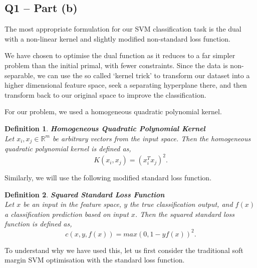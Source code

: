 \documentclass{article}
\newtheorem{definition}{Definition}[section]
\begin{document}
\subsection*{\textbf{Q1 – Part (b)}}
The most appropriate formulation for our SVM classification task is the dual with a non-linear kernel and slightly modified non-standard loss function. \par

We have chosen to optimise the dual function as it reduces to a far simpler problem than the initial primal, with fewer constraints. Since the data is non-separable, we can use the so called `kernel trick' \cite{scholkopf1997kernel, scholkopf1998nonlinear} to transform our dataset into a higher dimensional feature space, seek a separating hyperplane there, and then transform back to our original space to improve the classification. \par 

For our problem, we used a homogeneous quadratic polynomial kernel.
\begin{definition} \textbf{Homogeneous Quadratic Polynomial Kernel} \cite{shashua2009introduction} \\
Let $x_{i}, x_{j} \in \mathbb{R}^{m}$ be arbitrary vectors from the input space. Then the homogeneous quadratic polynomial kernel is defined as,
\begin{equation}
    K(x_{i},x_{j}) = (x_{i}^{T}x_{j})^2.
\end{equation} 
\end{definition} \par

Similarly, we will use the following modified standard loss function.
\begin{definition} \textbf{Squared Standard Loss Function} \cite{scholkopf2002learning:ch3} \\
Let $x$ be an input in the feature space, $y$ the true classification output, and $f(x)$ a classification prediction based on input $x$. Then the squared standard loss function is defined as,
\begin{equation}
    c(x, y, f(x)) = max(0, 1-yf(x))^2.
\end{equation}
\end{definition} \par

To understand why we have used this, let us first consider the traditional soft margin SVM optimisation with the standard loss function. 
\end{document}
